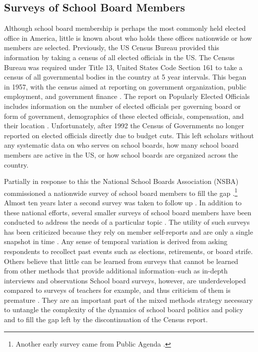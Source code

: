\subsection{Surveys of School Board Members}

Although school board membership is perhaps the most commonly held elected office in America, little is known about who holds these offices nationwide or how members are selected. Previously, the US Census Bureau provided this information by taking a census of all elected officials in the US. The Census Bureau was required under Title 13, United States Code Section 161 to take a census of all governmental bodies in the country at 5 year intervals. This began in 1957, with the census aimed at reporting on government organization, public employment, and government finance \citep{RefWorks:324}. The report on Popularly Elected Officials includes information on the number of elected officials per governing board or form of government, demographics of these elected officials, compensation, and their location \citep{RefWorks:325}. Unfortunately, after 1992 the Census of Governments no longer reported on elected officials directly due to budget cuts. This left scholars without any systematic data on who serves on school boards, how many school board members are active in the US, or how school boards are organized across the country. 

Partially in response to this the National School Boards Association (NSBA) commissioned a nationwide survey of school board members to fill the gap \citep{RefWorks:321}.\footnote{Another early survey came from Public Agenda \citep{RefWorks:330}.} Almost ten years later a second survey was taken to follow up \citep{RefWorks:322}. In addition to these national efforts, several smaller surveys of school board members have been conducted 
to address the needs of a particular topic \citep[see][]{RefWorks:264,speer1998reaching,RefWorks:311,RefWorks:328}. The utility of such surveys has been criticized because they rely on member self-reports and are only a single snapshot in time  \citep{RefWorks:327}. Any sense of temporal variation is derived from asking respondents to recollect past events such as elections, retirements, or board strife. Others believe that little can be learned from surveys that cannot be learned from other methods that provide additional information--such as in-depth interviews and observations \citep{RefWorks:329}
School board surveys, however, are underdeveloped compared to surveys of teachers for example, and thus criticism of them is premature \citep{RefWorks:312}. They are an important part of the mixed methods strategy necessary to untangle the complexity of the dynamics of school board politics and policy and to fill the gap left by the discontinuation of the Census report.

